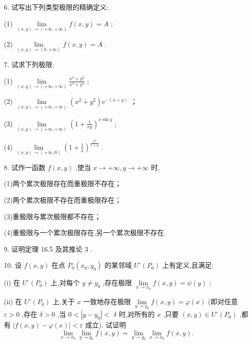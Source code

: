 6. 试写出下列类型极限的精确定义:

(1) \(\mathop{\lim }\limits_{{\left( {x,y}\right)  \rightarrow  \left( {+\infty , + \infty }\right) }}f\left( {x,y}\right)  = A\) ;

(2) \(\mathop{\lim }\limits_{{\left( {x,y}\right)  \rightarrow  \left( {0, + \infty }\right) }}f\left( {x,y}\right)  = A\) .

7. 试求下列极限:

(1) \(\mathop{\lim }\limits_{{\left( {x,y}\right)  \rightarrow  \left( {+\infty , + \infty }\right) }}\frac{{x}^{2} + {y}^{2}}{{x}^{4} + {y}^{4}}\) ;

(2) \(\mathop{\lim }\limits_{{\left( {x,y}\right)  \rightarrow  \left( {+\infty , + \infty }\right) }}\left( {{x}^{2} + {y}^{2}}\right) {\mathrm{e}}^{-\left( {x + y}\right) }\) ；

(3) \(\mathop{\lim }\limits_{{\left( {x,y}\right)  \rightarrow  \left( {+\infty , + \infty }\right) }}{\left( 1 + \frac{1}{xy}\right) }^{x\sin y}\) ;

(4) \(\mathop{\lim }\limits_{{\left( {x,y}\right)  \rightarrow  \left( {+\infty ,0}\right) }}{\left( 1 + \frac{1}{x}\right) }^{\frac{{x}^{2}}{x + y}}\) .

8. 试作一函数 \(f\left( {x,y}\right)\) ,使当 \(x \rightarrow   + \infty ,y \rightarrow   + \infty\) 时,

(1)两个累次极限存在而重极限不存在；

(2)两个累次极限不存在而重极限存在；

(3)重极限与累次极限都不存在；

(4)重极限与一个累次极限存在,另一个累次极限不存在.

9. 证明定理 16.5 及其推论 3 .

10. 设 \(f\left( {x,y}\right)\) 在点 \({P}_{0}\left( {{x}_{0},{y}_{0}}\right)\) 的某邻域 \({U}^{ \circ  }\left( {P}_{0}\right)\) 上有定义,且满足:

(i) 在 \({U}^{ \circ  }\left( {P}_{0}\right)\) 上,对每个 \(y \neq  {y}_{0}\) ,存在极限 \(\mathop{\lim }\limits_{{x \rightarrow  {x}_{0}}}f\left( {x,y}\right)  = \psi \left( y\right)\) ;

(ii) 在 \({U}^{ \circ  }\left( {P}_{0}\right)\) 上,关于 \(x\) 一致地存在极限 \(\mathop{\lim }\limits_{{y \rightarrow  {y}_{0}}}f\left( {x,y}\right)  = \varphi \left( x\right)\) (即对任意 \(\varepsilon  > 0\) ,存在 \(\delta  > 0\) ,当 \(0 < \left| {y - {y}_{0}}\right|  <\)  \(\delta\) 时,对所有的 \(x\) ,只要 \(\left( {x,y}\right)  \in  {U}^{ \circ  }\left( {P}_{0}\right)\) ,都有 \(\left| {f\left( {x,y}\right)  - \varphi \left( x\right) }\right|  < \varepsilon\) 成立). 试证明
\[
\mathop{\lim }\limits_{{x \rightarrow  {x}_{0}}}\mathop{\lim }\limits_{{y \rightarrow  {y}_{0}}}f\left( {x,y}\right)  = \mathop{\lim }\limits_{{y \rightarrow  {y}_{0}}}\mathop{\lim }\limits_{{x \rightarrow  {x}_{0}}}f\left( {x,y}\right) .
\]
